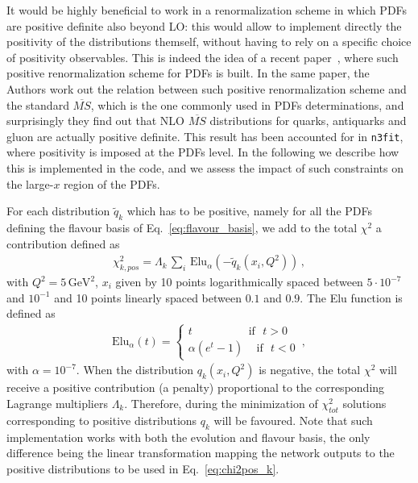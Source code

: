 %
It would be highly beneficial to work in a renormalization scheme in which PDFs are positive definite
also beyond LO: this would allow to implement directly the positivity of the distributions themself,
without having to rely on a specific choice of positivity observables.
This is indeed the idea of a recent paper~\cite{Candido:2020yat}, where such positive renormalization
scheme for PDFs is built. In the same paper, the Authors work out the relation between such positive
renormalization scheme and the standard $\overline{MS}$, which is the one commonly used in 
PDFs determinations, and surprisingly they find out that NLO $\overline{MS}$ distributions
for quarks, antiquarks and gluon are actually positive definite.  
This result has been accounted for in {\tt n3fit}, where positivity is imposed at the PDFs level.
In the following we describe how this is implemented in the code, and we assess the impact of such constraints
on the large-$x$ region of the PDFs.

%
For each distribution $\tilde{q}_k$ which has to be positive, namely for all the PDFs defining the
flavour basis of Eq.~\eqref{eq:flavour_basis}, we add to the total $\chi^2$ a contribution defined as  
\begin{align}
	\label{eq:chi2pos_k}
	\chi^2_{k,pos} = \Lambda_k \,\sum_i \,\text{Elu}_{\alpha}\left(-\tilde{q}_k\left(x_i,Q^2\right)\right)\,,
\end{align}
with $Q^2 = 5\, \text{GeV}^2$, $x_i$ given by 10 points logarithmically spaced between $5\cdot10^{-7}$ and $10^{-1}$ and 10 points
linearly spaced between $0.1$ and $0.9$. The Elu function is defined as 
\begin{align}
	\label{eq:Elu}
	\text{Elu}_{\alpha}\left(t\right) = 
	\begin{cases}
		t \,\,\,\,\,\,\,\,\,\,\,\,\,\,\,\,\,\,\,\,\,\,\,\,\,\,\,\,\,\,\text{if}\,\,\,\, t>0 \\
		\alpha\left(e^t-1\right)\,\,\,\,\,\,\,\text{if}\,\,\,\, t<0
	\end{cases}\,,
\end{align} 
with $\alpha=10^{-7}$. 
When the distribution $q_k\left(x_i, Q^2\right)$ is negative, the total $\chi^2$ will receive a positive contribution
(a penalty) proportional to the corresponding Lagrange multipliers $\Lambda_k$. 
Therefore, during the minimization of $\chi^2_{tot}$ solutions corresponding to positive distributions $q_k$
will be favoured. Note that such implementation works with both the evolution and flavour basis, the only 
difference being the linear transformation mapping the network outputs to the positive distributions to be 
used in Eq.~\eqref{eq:chi2pos_k}.

